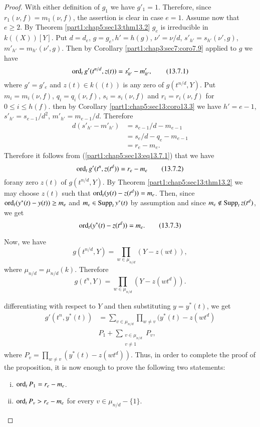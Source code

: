 \begin{proof}
  With either definition of $g_1$ we have $g'_1 =1$. Therefore, since
  $r_1 (\nu, f)=m_1 (\nu, f)$, the assertion is clear in case
  $e=1$. Assume now that $e \geq 2$. By
  Theorem \ref{part1:chap5:sec13:thm13.2} $g_e$ is irreducible in
  $k((X))[Y]$. Put $d=d_e$, $g= g_e, h'= h(g)$, $\nu' = \nu/d$,
  $s'_{h'} = s_{h'}(\nu', g)$, $m'_{h'} =m_{h'}(\nu' ,g)$. Then by
  Corollary \ref{part1:chap3:sec7:coro7.9} applied to $g$ we have
\begin{equation*}
  \operatorname{ord}_t g' (t^{n/d}, z(t))= s'_{h'}-
  m'_{h'},\tag{13.7.1}\label{part1:chap5:sec13:eq13.7.1} 
\end{equation*}
where $g'= g'_e$ and $z(t) \in k((t))$ is any zero of $g(t^{n/d},
Y)$. Put $m_i= m_i(\nu, f)$, $q_i = q_i (\nu, f)$, $s_i= s_i (\nu, f)$
and $r_i = r_i(\nu, f)$ for $0 \leq i \leq h(f)$. then by Corollary
\ref{part1:chap5:sec13:coro13.3} we have $h' = e-1$, $s'_{h'}=
s_{e-1}/d^2$, $m'_{h'}= m_{e-1}/d$. Therefore
\begin{align*}
  d (s'_{h'}- m'_{h'})& = s_{e-1}/d-m_{e-1}\\
  & = s_e /d - q_e - m_{e-1}\\
  & = r_e - m_e.
\end{align*}
Therefore it follows from (\ref{part1:chap5:sec13:eq13.7.1}) that we
have
\begin{equation*}
  \operatorname{ord}_t g' (t^n , z(t^d)) = r_e - m_e
  \tag{13.7.2}\label{part1:chap5:sec13:eq13.7.2}
\end{equation*}
for\pageoriginale any zero $z(t)$ of $g(t^{n/d}, Y)$. By Theorem
\ref{part1:chap5:sec13:thm13.2} we may choose $z(t)$ such that
$\operatorname{ord}_t(y(t)- z(t^d))= m_e$. Then, since $\operatorname{ord}_t (y^* (t)- y(t)) \geq
m_e$ and $m_e \in \operatorname{Supp}_t y^*(t)$ by assumption and since $m_e \notin
\operatorname{Supp}_t z(t^d)$, we get 
\begin{equation*}
  \operatorname{ord}_t (y^* (t)-
  z(t^d))=m_e.\tag{13.7.3} \label{part1:chap5:sec13:eq13.7.3}   
\end{equation*}

Now, we have
$$
g(t^{n/d}, Y)= \prod_{w \in \mu_{n/d}} (Y - z(wt)),
$$
where $\mu_{n/d} = \mu_{n/d}(k)$. Therefore
$$
g(t^n, Y) = \prod_{w \in \mu_{n/d}} (Y- z(wt^d)).
$$

differentiating with respect to $Y$ and then substituting $y= y^*(t)$,
we get
\begin{align*}
g' (t^n, y^* (t)) &= \sum_{v \in \mu_{n/d}} \prod_{w \neq v} (y^* (t)-
z(wt^d)\\
& P_1 + \sum_{\substack{v \in \mu_{n/d}\\v \neq 1}} P_v,
\end{align*}
where $\displaystyle{P_v= \prod_{w \neq v} (y^* (t) -
  z(wt^d))}$. Thus, in order to complete the proof of the proposition,
it is now enough to prove the following two statements:
\begin{enumerate}[(i)]
\item $\operatorname{ord}_t P_1 = r_e - m_e$.
\item $\operatorname{ord}_t P_v > r_e - m_e$ for every $v \in \mu_{n/d}- \{1 \}$.
\end{enumerate}


\end{proof}
